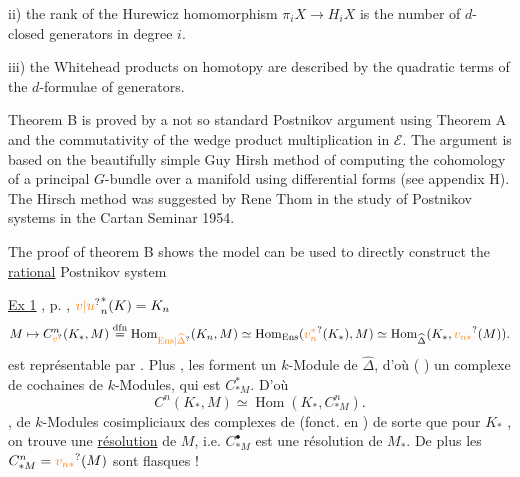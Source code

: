 ii) the rank of the Hurewicz homomorphism $\pi_i X\to H_i X$ is the number of $d$-closed generators in degree $i$.

iii) the Whitehead products on homotopy are described by the quadratic terms of the $d$-formulae of generators.

Theorem B is proved by a not so standard Postnikov argument using Theorem A and the commutativity of the wedge product multiplication in $\mathcal{E}$. The argument is based on the beautifully simple Guy Hirsh method of computing the cohomology of a principal $G$-bundle over a manifold using differential forms (see appendix H). The Hirsch method was suggested by Rene Thom in the study of Postnikov systems in the Cartan Seminar 1954.

The proof of theorem B shows the model can be used to directly construct the \uline{rational} Postnikov system

\uline{Ex 1}  , p. ,  $\unsure{v|u}_n^*(K)=K_n$
\[
 M\mapsto C_{\unsure{v}}^n(K_*,M)\overset{\mathrm{dfn}}{=}
 \operatorname{Hom}_{\unsure{\mathrm{Ens}|\widehat{\Delta}}}(K_n,M)
 \simeq\operatorname{Hom}_{\mathrm{Ens}}(\unsure{v_n^*}(K_*),M)
 \simeq\operatorname{Hom}_{\widehat{\Delta}}(K_*,\unsure{v_{n*}}(M)).
\]
est représentable par . Plus , les  forment un $k$-Module  de $\widehat{\Delta}$, d'où ( ) un complexe de cochaines de $k$-Modules, qui est $C_{*M}^{*}$. D'où
\[
 C^n(K_*,M)\simeq\operatorname{Hom}(K_*,C_{*M}^n).
\]
, de $k$-Modules cosimpliciaux  des complexes de  (fonct. en ) de sorte que pour $K_*$ , on trouve une \uline{résolution} de $M$, i.e. $C_{*M}^\bullet$ est une résolution de $M_*$. De plus les $C_{*M}^n=\unsure{v_{n*}}(M)$ sont flasques  !

